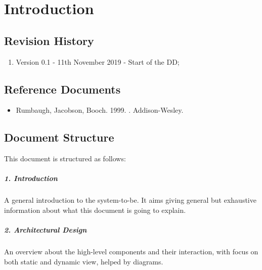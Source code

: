 \documentclass[../DD.tex]{subfiles}
\begin{document}
\chapter{Introduction}
\thispagestyle{fancy}
		
		
		
		
		\section{Revision History}
		\begin{enumerate}
			\item Version 0.1 - 11th November 2019 - Start of the DD;
			
			
		\end{enumerate}
		\section{Reference Documents}
		\begin{itemize}
			\item Rumbaugh, Jacobson, Booch. 1999. . Addison-Wesley.
		\end{itemize}
		\section{Document Structure}
		This document is structured as follows:
		\paragraph{1. Introduction}
		A general introduction to the system-to-be. It aims giving general but exhaustive information about what this document is going to explain.
		\paragraph{2. Architectural Design}
		An overview about the high-level components	and	their interaction, with focus on both static and dynamic view, helped by diagrams.
\end{document}
